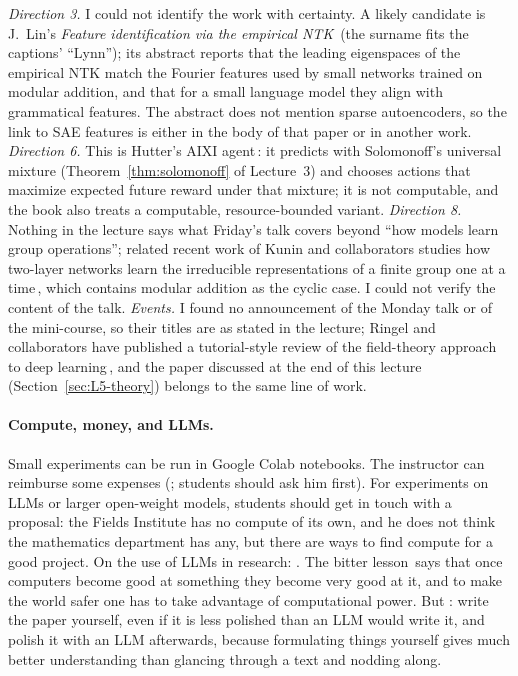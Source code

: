 \begin{beyond}
\emph{Direction 3.} I could not identify the work with certainty. A likely candidate is J.~Lin's \emph{Feature identification via the empirical NTK}\,\citep{lin2025} (the surname fits the captions' ``Lynn''); its abstract reports that the leading eigenspaces of the empirical NTK match the Fourier features used by small networks trained on modular addition, and that for a small language model they align with grammatical features. The abstract does not mention sparse autoencoders, so the link to SAE features is either in the body of that paper or in another work. \emph{Direction 6.} This is Hutter's AIXI agent\,\citep{hutter2005}: it predicts with Solomonoff's universal mixture (Theorem~\ref{thm:solomonoff} of Lecture~3) and chooses actions that maximize expected future reward under that mixture; it is not computable, and the book also treats a computable, resource-bounded variant. \emph{Direction 8.} Nothing in the lecture says what Friday's talk covers beyond ``how models learn group operations''; related recent work of Kunin and collaborators studies how two-layer networks learn the irreducible representations of a finite group one at a time\,\citep{marchetti2026}, which contains modular addition as the cyclic case. I could not verify the content of the talk. \emph{Events.} I found no announcement of the Monday talk or of the mini-course, so their titles are as stated in the lecture; Ringel and collaborators have published a tutorial-style review of the field-theory approach to deep learning\,\citep{ringel2025}, and the paper discussed at the end of this lecture (Section~\ref{sec:L5-theory}) belongs to the same line of work.
\end{beyond}

\paragraph{Compute, money, and LLMs.}
Small experiments can be run in Google Colab notebooks. The instructor can reimburse some expenses (; students should ask him first). For experiments on LLMs or larger open-weight models, students should get in touch with a proposal: the Fields Institute has no compute of its own, and he does not think the mathematics department has any, but there are ways to find compute for a good project. On the use of LLMs in research: . The bitter lesson\,\citep{sutton2019} says that once computers become good at something they become very good at it, and to make the world safer one has to take advantage of computational power. But : write the paper yourself, even if it is less polished than an LLM would write it, and polish it with an LLM afterwards, because formulating things yourself gives much better understanding than glancing through a text and nodding along.

